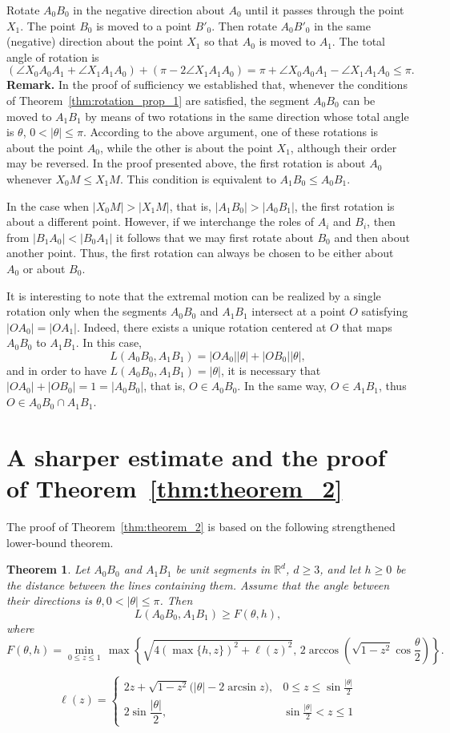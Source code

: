 \documentclass[a4paper,12pt,reqno]{amsart}
\newtheorem{theorem}{Theorem}
\begin{document}
Rotate $A_0B_0$ in the negative direction about $A_0$ until it passes through the point $X_1$. The point $B_0$ is moved to a point $B'_0$. Then rotate $A_0B'_0$ in the same (negative) direction about the point $X_1$ so that $A_0$ is moved to $A_1$. The total angle of rotation is
\[
( \angle X_0A_0A_1+\angle X_1A_1A_0)+ (\pi-2\angle X_1A_1A_0)=\pi +\angle X_0A_0A_1-\angle X_1A_1A_0\le \pi. 
\]
\smallskip
\noindent \textbf{Remark.} In the proof of sufficiency we established that, whenever the conditions of Theorem~\ref{thm:rotation_prop_1} are satisfied, the segment $A_0B_0$ can be moved to $A_1B_1$ by means of two rotations in the same direction whose total angle is $\theta$, $0<|\theta|\le \pi$. According to the above argument, one of these rotations is about the point $A_0$, while the other is about the point $X_1$, although their order may be reversed. In the proof presented above, the first rotation is about $A_0$ whenever $X_0M\le X_1M$. This condition is equivalent to $A_1B_0\le A_0B_1$.

In the case when $|X_0M|> |X_1M|$, that is, $|A_1B_0|> |A_0B_1|$, the first rotation is about a different point. However, if we interchange the roles of $A_i$ and $B_i$, then from $|B_1A_0|<|B_0A_1|$ it follows that we may first rotate about $B_0$ and then about another point. Thus, the first rotation can always be chosen to be either about $A_0$ or about $B_0$.

It is interesting to note that the extremal motion can be realized by a single rotation only when the segments $A_0B_0$ and $A_1B_1$ intersect at a point $O$ satisfying $|OA_0|=|OA_1|$. Indeed, there exists a unique rotation centered at $O$ that maps $A_0B_0$ to $A_1B_1$. In this case,
\[
L(A_0B_0,A_1B_1)=|OA_0||\theta|+|OB_0||\theta|,
\]
and in order to have $L(A_0B_0,A_1B_1)=|\theta|$, it is necessary that $|OA_0|+|OB_0|=1=|A_0B_0|$, that is, $O\in A_0B_0$. In the same way, $O\in A_1B_1$, thus $O\in A_0B_0\cap A_1B_1$.

\section{A sharper estimate and the proof of Theorem~\ref{thm:theorem_2}}

The proof of Theorem~\ref{thm:theorem_2} is based on the following strengthened lower-bound theorem.
\begin{theorem}
\label{prop:self_rotating_case_in_R3}
Let $A_0B_0$ and $A_1B_1$ be unit segments in $\mathbb{R}^d$, $d\ge 3$,
and let $h\ge 0$ be the distance between the lines containing them. 
Assume that the angle between their directions is $\theta, 0<|\theta|\le \pi$. Then
\[
L(A_0B_0,A_1B_1)
\ge
F(\theta, h),
\]
where
\[
F(\theta,h)=
\min_{0\le z\le 1}\,\max\left\{
\sqrt{4\left(\max\{h,z\}\right)^2+\ell(z)^2},
\,2\arccos\left(\sqrt{1-z^2}\cos\frac{\theta}{2}\right)
\right\}.
\]

\[
\ell(z)=
\begin{cases}
2z+\sqrt{1-z^2}\bigl(|\theta|-2\arcsin z\bigr),
&
0\le z\le \sin{\frac{|\theta|}{2}}
\\[8pt]
2\sin\dfrac{|\theta|}{2},
&
\sin{\frac{|\theta|}{2}}<z\le 1
\end{cases}
\]
\end{theorem}
\end{document}
